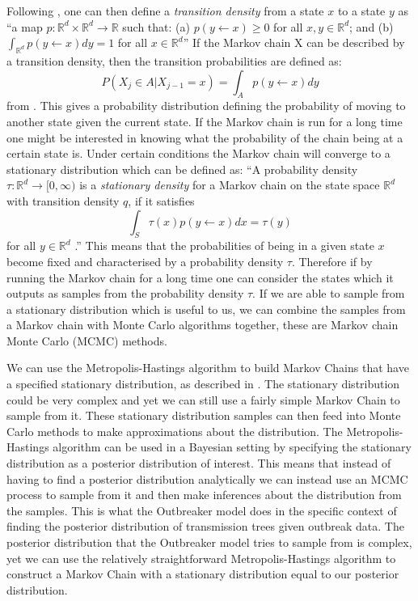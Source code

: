 \documentclass[11pt,a4paper]{report}
\begin{document}
Following \citep{Voss14}, one can then define a \emph{transition density} from a state $x$ to a state $y$ as ``a map $p: \mathbb{R}^d \times \mathbb{R}^d \rightarrow \mathbb{R}$ such that: \newline
(a) $p(y \leftarrow x) \geq 0$ for all $x,y \in \mathbb{R}^d$; and \newline
(b) $\int_{\mathbb{R}^d} p(y \leftarrow x) dy = 1$ for all $x \in \mathbb{R}^d$'' \newline
If the Markov chain X can be described by a transition density, then the transition probabilities are defined as: 
\begin{equation}
P(X_j \in A | X_{j-1} = x) = \int_A p(y \leftarrow x)dy
\end{equation}
from \citet{Voss14}.
This gives a probability distribution defining the probability of moving to another state given the current state. If the Markov chain is run for a long time one might be interested in knowing what the probability of the chain being at a certain state is. Under certain conditions the Markov chain will converge to a stationary distribution which can be defined as: ``A probability density $\tau:\mathbb{R}^{d} \rightarrow [0,\infty)$ is a \emph{stationary density} for a Markov chain on the state space $\mathbb{R}^d$ with transition density $q$, if it satisfies
\begin{equation}
\int_S \tau(x)p(y \leftarrow x)dx = \tau(y)
\end{equation}
for all $y \in \mathbb{R}^d$ \citep{Voss14}.'' 
This means that the probabilities of being in a given state $x$ become fixed and characterised by a probability density $\tau$. Therefore if by running the Markov chain for a long time one can consider the states which it outputs as samples from the probability density $\tau$. If we are able to sample from a stationary distribution which is useful to us, we can combine the samples from a Markov chain with Monte Carlo algorithms together, these are Markov chain Monte Carlo (MCMC) methods.

We can use the Metropolis-Hastings algorithm to build Markov Chains that have a specified stationary distribution, as described in \citet{Gilks96}. The stationary distribution could be very complex and yet we can still use a fairly simple Markov Chain to sample from it. These stationary distribution samples can then feed into Monte Carlo methods to make approximations about the distribution. The Metropolis-Hastings algorithm can be used in a Bayesian setting by specifying the stationary distribution as a posterior distribution of interest. This means that instead of having to find a posterior distribution analytically we can instead use an MCMC process to sample from it and then make inferences about the distribution from the samples. This is what the Outbreaker model does in the specific context of finding the posterior distribution of transmission trees given outbreak data. The posterior distribution that the Outbreaker model tries to sample from is complex, yet we can use the relatively straightforward Metropolis-Hastings algorithm to construct a Markov Chain with a stationary distribution equal to our posterior distribution.
\end{document}
